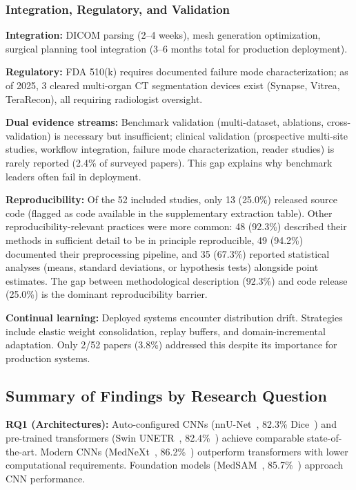 \documentclass[conference]{IEEEtran}
\begin{document}
\subsubsection{Integration, Regulatory, and Validation}

\textbf{Integration:} DICOM parsing (2--4 weeks), mesh generation optimization, surgical planning tool integration (3--6 months total for production deployment).

\textbf{Regulatory:} FDA 510(k) requires documented failure mode characterization; as of 2025, 3 cleared multi-organ CT segmentation devices exist (Synapse, Vitrea, TeraRecon), all requiring radiologist oversight.

\textbf{Dual evidence streams:} Benchmark validation (multi-dataset, ablations, cross-validation) is necessary but insufficient; clinical validation (prospective multi-site studies, workflow integration, failure mode characterization, reader studies) is rarely reported (2.4\% of surveyed papers). This gap explains why benchmark leaders often fail in deployment.

\textbf{Reproducibility:} Of the 52 included studies, only 13 (25.0\%) released source code (flagged as code available in the supplementary extraction table). Other reproducibility-relevant practices were more common: 48 (92.3\%) described their methods in sufficient detail to be in principle reproducible, 49 (94.2\%) documented their preprocessing pipeline, and 35 (67.3\%) reported statistical analyses (means, standard deviations, or hypothesis tests) alongside point estimates. The gap between methodological description (92.3\%) and code release (25.0\%) is the dominant reproducibility barrier.

\textbf{Continual learning:} Deployed systems encounter distribution drift. Strategies include elastic weight consolidation, replay buffers, and domain-incremental adaptation. Only 2/52 papers (3.8\%) addressed this despite its importance for production systems.

\subsection{Summary of Findings by Research Question}

\textbf{RQ1 (Architectures):} Auto-configured CNNs (nnU-Net~\cite{isensee2021nnunet}, 82.3\% Dice~\cite{isensee2021nnunet}) and pre-trained transformers (Swin UNETR~\cite{swinunetr2022}, 82.4\%~\cite{swinunetr2022}) achieve comparable state-of-the-art. Modern CNNs (MedNeXt~\cite{roy2023mednext}, 86.2\%~\cite{roy2023mednext}) outperform transformers with lower computational requirements. Foundation models (MedSAM~\cite{ma2024medsam}, 85.7\%~\cite{ma2024medsam}) approach CNN performance.
\end{document}
